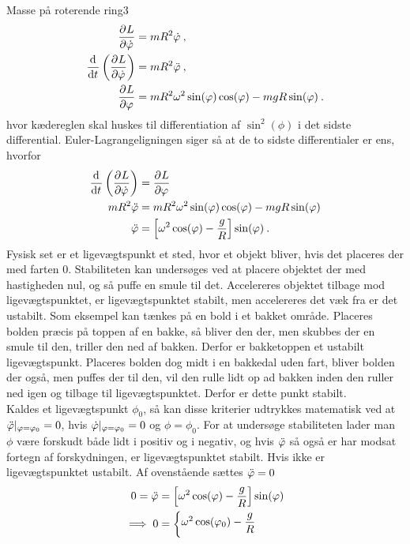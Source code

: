 \begin{opgave}{Masse på roterende ring}{3}
\begin{align*}
	\frac{\partial^{}{L}}{\partial {\dot{\varphi}}^{}} &= mR^2\dot{\varphi} \: , \\
	\frac{\mathrm{d}^{}{}}{{\mathrm{d} {t}}^{}}\left(\frac{\partial^{}{L}}{\partial {\dot{\varphi}}^{}}\right) &= mR^2\ddot{\varphi} \: , \\
	\frac{\partial^{}{L}}{\partial {\varphi}^{}} &= mR^2\omega^2\sin(\varphi)\cos(\varphi) - mgR\sin(\varphi) \: .
\end{align*}
hvor kædereglen skal huskes til differentiation af $\sin^2(\phi)$ i det sidste differential. Euler-Lagrangeligningen siger så at de to sidste differentialer er ens, hvorfor
\begin{equation} \label{eq:BeadOnHoopEOM}
	\begin{aligned}
		\frac{\mathrm{d}^{}{}}{{\mathrm{d} {t}}^{}}\left(\frac{\partial^{}{L}}{\partial {\dot{\varphi}}^{}}\right) &= \frac{\partial^{}{L}}{\partial {\varphi}^{}} \\
		mR^2\ddot{\varphi} &= mR^2\omega^2\sin(\varphi)\cos(\varphi) - mgR\sin(\varphi) \\
		\ddot{\varphi} &= \left[\omega^2\cos(\varphi) - \frac{g}{R}\right]\sin(\varphi) \: .
\end{aligned}
\end{equation}
\opg Fysisk set er et ligevægtspunkt et sted, hvor et objekt bliver, hvis det placeres der med farten $0$. Stabiliteten kan undersøges ved at placere objektet der med hastigheden nul, og så puffe en smule til det. Accelereres objektet tilbage mod ligevægtspunktet, er ligevægtspunktet stabilt, men accelereres det væk fra er det ustabilt. Som eksempel kan tænkes på en bold i et bakket område. Placeres bolden præcis på toppen af en bakke, så bliver den der, men skubbes der en smule til den, triller den ned af bakken. Derfor er bakketoppen et ustabilt ligevægtspunkt. Placeres bolden dog midt i en bakkedal uden fart, bliver bolden der også, men puffes der til den, vil den rulle lidt op ad bakken inden den ruller ned igen og tilbage til ligevægtspunktet. Derfor er dette punkt stabilt. \\
Kaldes et ligevægtspunkt $\phi_0$, så kan disse kriterier udtrykkes matematisk ved at $\ddot{\varphi}|_{\varphi=\varphi_0} = 0$, hvis $\dot{\varphi}|_{\varphi=\varphi_0} = 0$ og $\phi = \phi_0$. For at undersøge stabiliteten lader man $\phi$ være forskudt både lidt i positiv og i negativ, og hvis $\ddot{\varphi}$ så også er har modsat fortegn af forskydningen, er ligevægtspunktet stabilt. Hvis ikke er ligevægtspunktet ustabilt.
\opg Af ovenstående sættes $\ddot{\varphi} = 0$
\begin{align*}
	0 = \ddt{\phi} &= \left[\omega^2\cos(\phi) - \frac{g}{R}\right]\sin(\phi) \\
	\implies 0 &= \begin{cases} \omega^2\cos(\phi_0) - \dfrac{g}{R} \vspace{1mm}\\

\end{cases}
\end{align*}
\end{opgave}
